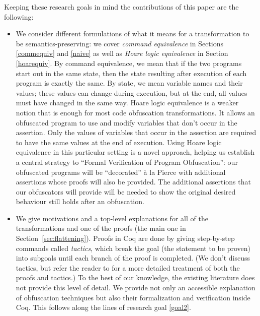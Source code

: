 \documentclass[compsoc,conference,a4paper,10pt,times]{IEEEtran}
\begin{document}
Keeping these research goals in mind the contributions of this paper are the following:
\begin{itemize}
    \item \label{itm:1} We consider different formulations of what it means for a transformation to be semantics-preserving: we cover \emph{command equivalence} in Sections \ref{commequiv} and \ref{naive} as well as \emph{Hoare logic equivalence} in Section \ref{hoarequiv}. By command equivalence, we mean that if the two programs start out in the same state, then the state resulting after execution of each program is exactly the same.  By state, we mean variable names and their values; these values can change during execution, but at the end, all values must have changed in the same way.  
    Hoare logic equivalence is a weaker notion that is enough for most code obfuscation transformations. It allows an obfuscated program to use and modify variables that don't occur in the assertion.  Only the values of variables that occur in the assertion are required to have the same values at the end of execution.  Using Hoare logic equivalence in this particular setting is a novel approach, helping us establish a central strategy to ``Formal Verification of Program Obfuscation'': our obfuscated programs will be ``decorated''  \`a la  Pierce \cite{SFV2} with additional assertions whose proofs will also be provided. The additional assertions that our obfuscators will provide will be needed to show the original desired behaviour still holds after an obfuscation.
    
    
    \item We give motivations and a top-level explanations for all of the transformations and one of the proofs (the main one in Section~\ref{sec:flattening}).  Proofs in Coq are done by giving step-by-step commands called \emph{tactics}, which break the goal (the statement to be proven) into subgoals until each branch of the proof is completed.  (We don't discuss tactics, but
    refer the reader to \cite{Weiyun} for a more detailed treatment of both the proofs and tactics.) 
    To the best of our knowledge, the existing literature does not provide this level of detail. We provide not only an accessible explanation of obfuscation techniques but also their formalization and verification inside Coq. This follows along the lines of research goal \ref{goal2}. 
 

\end{itemize}
\end{document}
